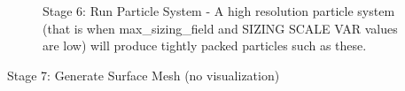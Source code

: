 \documentclass[fleqn,12pt,openany]{book}
\begin{document}
\begin{figure}[h!]
\begin{center}
\end{center}
\caption{\label{fig:MickeyPS}Stage 6: Run Particle System - A high resolution particle system (that is when max\_sizing\_field and SIZING SCALE VAR values are low) will produce tightly packed particles such as these.}
\end{figure} 
Stage 7: Generate Surface Mesh (no visualization) \\ \\
\end{document}
